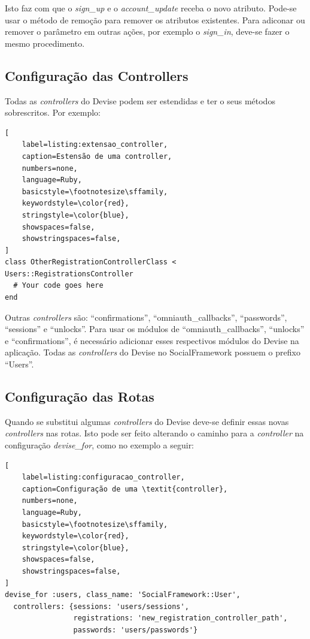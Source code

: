 Isto faz com que o \textit{sign\_up} e o \textit{account\_update} receba o novo atributo. Pode-se usar o método de remoção para remover os atributos existentes. Para adiconar ou remover o parâmetro em outras ações, por exemplo o \textit{sign\_in}, deve-se fazer o mesmo procedimento.

\subsection{Configuração das Controllers}

Todas as \textit{controllers} do Devise podem ser estendidas e ter o seus métodos sobrescritos. Por exemplo:

\begin{lstlisting}[
    label=listing:extensao_controller,
    caption=Estensão de uma controller,
    numbers=none,
    language=Ruby,
    basicstyle=\footnotesize\sffamily,
    keywordstyle=\color{red},
    stringstyle=\color{blue},
    showspaces=false,
    showstringspaces=false,
]
class OtherRegistrationControllerClass < Users::RegistrationsController
  # Your code goes here
end
\end{lstlisting}

Outras \textit{controllers} são: ``confirmations'', ``omniauth\_callbacks'', ``passwords'', ``sessions'' e ``unlocks''. Para usar os módulos de ``omniauth\_callbacks'', ``unlocks'' e ``confirmations'', é necessário adicionar esses respectivos módulos do Devise na aplicação. Todas as \textit{controllers} do Devise no SocialFramework possuem o prefixo ``Users''.

\subsection{Configuração das Rotas}

Quando se substitui algumas \textit{controllers} do Devise deve-se definir essas novas \textit{controllers} nas rotas. Isto pode ser feito alterando o caminho para a \textit{controller} na configuração \textit{devise\_for}, como no exemplo a seguir:

\begin{lstlisting}[
    label=listing:configuracao_controller,
    caption=Configuração de uma \textit{controller},
    numbers=none,
    language=Ruby,
    basicstyle=\footnotesize\sffamily,
    keywordstyle=\color{red},
    stringstyle=\color{blue},
    showspaces=false,
    showstringspaces=false,
]
devise_for :users, class_name: 'SocialFramework::User',
  controllers: {sessions: 'users/sessions',
                registrations: 'new_registration_controller_path',
                passwords: 'users/passwords'}
\end{lstlisting}

